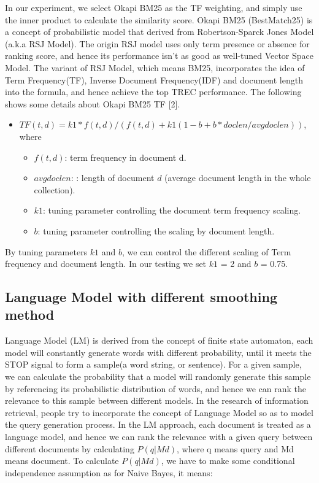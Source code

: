 \documentclass{article}
\begin{document}
In our experiment, we select Okapi BM25 as the TF weighting, and simply use the inner product to calculate the similarity score. Okapi BM25 (BestMatch25) is a concept of probabilistic model that derived from Robertson-Sparck Jones Model (a.k.a RSJ Model). The origin RSJ model uses only term presence or absence for ranking score, and hence its performance isn't as good as well-tuned Vector Space Model. The variant of RSJ Model, which means BM25, incorporates the
idea of Term Frequency(TF), Inverse Document Frequency(IDF) and document length into the formula, and hence achieve the top TREC performance. The following shows some details about Okapi BM25 TF [2].

\begin{itemize}
    \item $TF(t,d) = k1 * f(t,d) / (f(t,d) + k1(1 - b + b*doclen / avgdoclen))$, where
    \begin{itemize}
        \item $f(t,d)$: term frequency in document d.
        \item $avgdoclen$: : length of document $d$ (average document length in the whole collection).
        \item $k1$: tuning parameter controlling the document term frequency scaling.
        \item $b$: tuning parameter controlling the scaling by document length.
    \end{itemize}
\end{itemize}

By tuning parameters $k1$ and $b$, we can control the different scaling of Term frequency and document length. In our testing we set $k1$ = 2 and $b$ = 0.75.

\subsection{Language Model with different smoothing method}
Language Model (LM) is derived from the concept of finite state automaton, each model will
constantly generate words with different probability, until it meets the STOP signal to form a
sample(a word string, or sentence). For a given sample, we can calculate the probability that
a model will randomly generate this sample by referencing its probabilistic distribution of
words, and hence we can rank the relevance to this sample between different models. In the
research of information retrieval, people try to incorporate the concept of Language Model so
as to model the query generation process. In the LM approach, each document is treated as
a language model, and hence we can rank the relevance with a given query between
different documents by calculating $P(q | Md)$, where q means query and Md means
document.
To calculate $P(q | Md)$, we have to make some conditional independence assumption as for
Naive Bayes, it means: 
\end{document}
